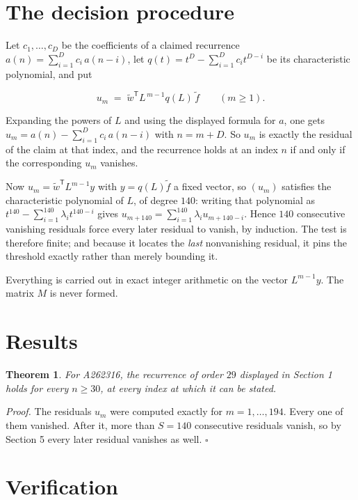 \documentclass[11pt]{article}
\newtheorem{theorem}{Theorem}
\theoremstyle{definition}
\begin{document}
\section{The decision procedure}

Let $c_1,\dots,c_D$ be the coefficients of a claimed recurrence $a(n) = \sum_{i=1}^{D} c_i\,a(n-i)$, let $q(t) = t^{D} - \sum_{i=1}^{D} c_i t^{D-i}$ be its characteristic polynomial, and put

\[u_m \;=\; \tilde w^{\mathsf T} L^{\,m-1} q(L)\,\tilde f \qquad (m \ge 1).\]

Expanding the powers of $L$ and using the displayed formula for $a$, one gets $u_m = a(n) - \sum_{i=1}^{D} c_i\,a(n-i)$ with $n = m + D$. So $u_m$ is exactly the residual of the claim at that index, and the recurrence holds at an index $n$ if and only if the corresponding $u_m$ vanishes.

Now $u_m = \tilde w^{\mathsf T} L^{m-1} y$ with $y = q(L)\tilde f$ a fixed vector, so $(u_m)$ satisfies the characteristic polynomial of $L$, of degree $140$: writing that polynomial as $t^{140} - \sum_{i=1}^{140} \lambda_i t^{140-i}$ gives $u_{m+140} = \sum_{i=1}^{140} \lambda_i u_{m+140-i}$. Hence $140$ consecutive vanishing residuals force every later residual to vanish, by induction. The test is therefore finite; and because it locates the {\itshape last} nonvanishing residual, it pins the threshold exactly rather than merely bounding it.

Everything is carried out in exact integer arithmetic on the vector $L^{m-1}y$. The matrix $M$ is never formed.

\section{Results}

\begin{theorem} For A262316, the recurrence of order $29$ displayed in Section 1 holds for every $n \ge 30$, at every index at which it can be stated.\end{theorem}

{\itshape Proof.} The residuals $u_m$ were computed exactly for $m = 1,\dots,194$. Every one of them vanished. After it, more than $S = 140$ consecutive residuals vanish, so by Section 5 every later residual vanishes as well. $\square$

\section{Verification}
\end{document}

